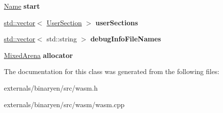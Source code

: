 \begin{DoxyCompactItemize}
\mbox{\hyperlink{structwasm_1_1_name}{Name}} {\bfseries start}
\item 
\mbox{\label{classwasm_1_1_module_ad129fa16d8baef4b495617a853da45f0}} 
\mbox{\hyperlink{classstd_1_1vector}{std\+::vector}}$<$ \mbox{\hyperlink{classwasm_1_1_user_section}{User\+Section}} $>$ {\bfseries user\+Sections}
\item 
\mbox{\label{classwasm_1_1_module_a136e69c752e0c5b0916abde1d5a026b3}} 
\mbox{\hyperlink{classstd_1_1vector}{std\+::vector}}$<$ std\+::string $>$ {\bfseries debug\+Info\+File\+Names}
\item 
\mbox{\label{classwasm_1_1_module_ab5f83bf161b2a94a5010ca88c33c7911}} 
\mbox{\hyperlink{struct_mixed_arena}{Mixed\+Arena}} {\bfseries allocator}
\end{DoxyCompactItemize}


The documentation for this class was generated from the following files\+:\begin{DoxyCompactItemize}
\item 
externals/binaryen/src/wasm.\+h\item 
externals/binaryen/src/wasm/wasm.\+cpp\end{DoxyCompactItemize}
